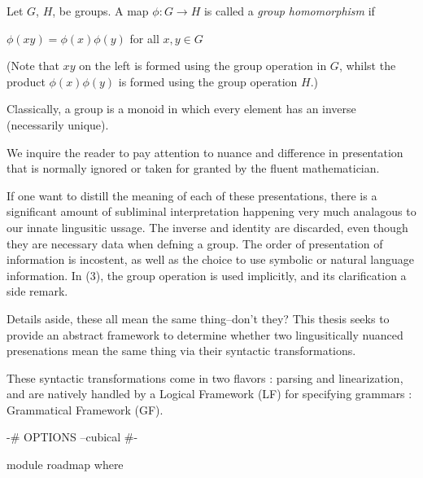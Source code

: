 
\begin{definition}
Let $G$, $H$, be groups.  A map $\phi : G \to H$ is called a \emph{group homomorphism} if
\begin{center}
  $\phi(xy) = \phi ( x ) \phi ( y )$ for all $x, y \in G$ 
\end{center}
(Note that $xy$ on the left is formed using the group operation in $G$, whilst the product $\phi ( x ) \phi ( y )$ is formed using the group operation $H$.)
\end{definition}


\begin{definition}
Classically, a group is a monoid in which every element has an inverse (necessarily unique).
\end{definition}

We inquire the reader to pay attention to nuance and difference in presentation
that is normally ignored or taken for granted by the fluent mathematician.

If one want to distill the meaning of each of these presentations, there is a
significant amount of subliminal interpretation happening very much analagous
to our innate lingusitic ussage.  The inverse and identity are discarded, even
though they are necessary data when defning a group. The order of presentation
of information is incostent, as well as the choice to use symbolic or natural
language information. In (3), the group operation is used implicitly, and its
clarification a side remark.

Details aside, these all mean the same thing--don't they?  This thesis seeks to provide an
abstract framework to determine whether two lingusitically nuanced presenations
mean the same thing via their syntactic transformations. 

These syntactic transformations come in two flavors : parsing and
linearization, and are natively handled by a Logical Framework (LF) for
specifying grammars : Grammatical Framework (GF).

\begin{code}[hide]
{-# OPTIONS --cubical #-}

module roadmap where

\end{code}

